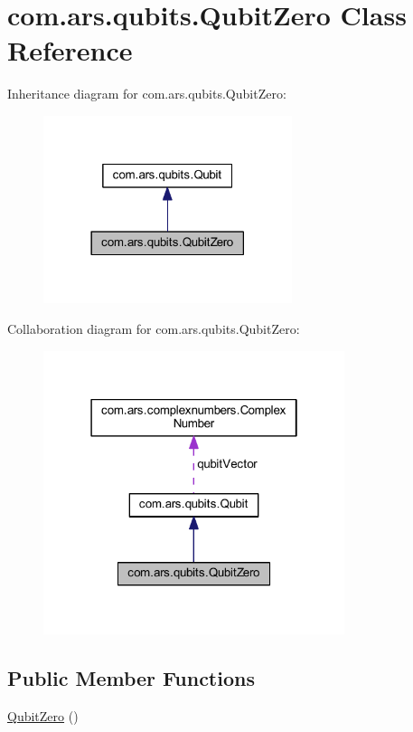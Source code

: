 \hypertarget{classcom_1_1ars_1_1qubits_1_1_qubit_zero}{}\section{com.\+ars.\+qubits.\+Qubit\+Zero Class Reference}
\label{classcom_1_1ars_1_1qubits_1_1_qubit_zero}


Inheritance diagram for com.\+ars.\+qubits.\+Qubit\+Zero\+:\nopagebreak
\begin{figure}[H]
\begin{center}
\leavevmode
\includegraphics[width=206pt]{classcom_1_1ars_1_1qubits_1_1_qubit_zero__inherit__graph}
\end{center}
\end{figure}


Collaboration diagram for com.\+ars.\+qubits.\+Qubit\+Zero\+:\nopagebreak
\begin{figure}[H]
\begin{center}
\leavevmode
\includegraphics[width=250pt]{classcom_1_1ars_1_1qubits_1_1_qubit_zero__coll__graph}
\end{center}
\end{figure}
\subsection*{Public Member Functions}
\begin{DoxyCompactItemize}
\item 
\hyperlink{classcom_1_1ars_1_1qubits_1_1_qubit_zero_a5844c1d4ff5a450e411f8e570b98b4af}{Qubit\+Zero} ()
\end{DoxyCompactItemize}

